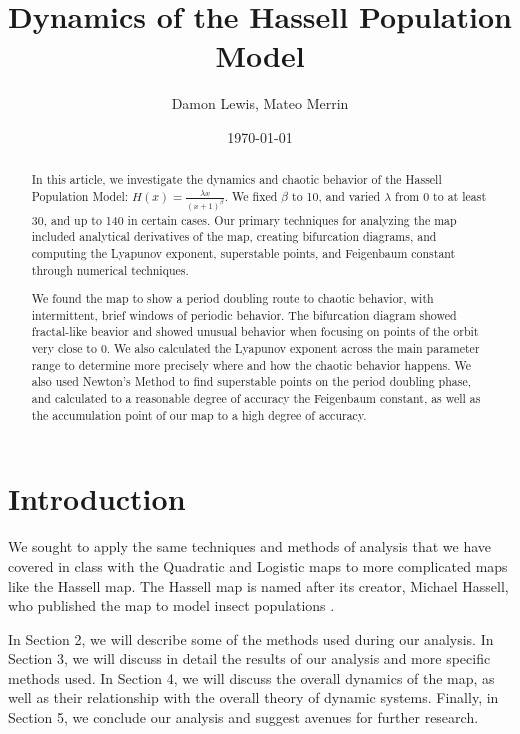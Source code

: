 \documentclass[12pt]{article}
\title{\bfseries Dynamics of the Hassell Population Model}
\author{Damon Lewis, Mateo Merrin}
\affil{CPSC/MATH 455 -- Chaos and Discrete Dynamical Systems \\ Gonzaga University}
\date{\today}
\begin{document}
\maketitle

\begin{abstract}
In this article, we investigate the dynamics and chaotic behavior of the Hassell Population Model: $H(x) = \frac{\lambda x}{\left( x + 1 \right)^\beta}$. We fixed $\beta$ to 10, and varied $\lambda$ from 0 to at least 30, and up to 140 in certain cases. Our primary techniques for analyzing the map included analytical derivatives of the map, creating bifurcation diagrams, and computing the Lyapunov exponent, superstable points, and Feigenbaum constant through numerical techniques. 

We found the map to show a period doubling route to chaotic behavior, with intermittent, brief windows of periodic behavior. The bifurcation diagram showed fractal-like beavior and showed unusual behavior when focusing on points of the orbit very close to 0. We also calculated the Lyapunov exponent across the main parameter range to determine more precisely where and how the chaotic behavior happens. We also used Newton's Method to find superstable points on the period doubling phase, and calculated to a reasonable degree of accuracy the Feigenbaum constant, as well as the accumulation point of our map to a high degree of accuracy.

\end{abstract}

\section{Introduction}

We sought to apply the same techniques and methods of analysis that we have covered in class with the Quadratic and Logistic maps to more complicated maps like the Hassell map. The Hassell map is named after its creator, Michael Hassell, who published the map to model insect populations \cite{hassell}. %

In Section 2, we will describe some of the methods used during our analysis. In Section 3, we will discuss in detail the results of our analysis and more specific methods used. In Section 4, we will discuss the overall dynamics of the map, as well as their relationship with the overall theory of dynamic systems. Finally, in Section 5, we conclude our analysis and suggest avenues for further research.
\end{document}
